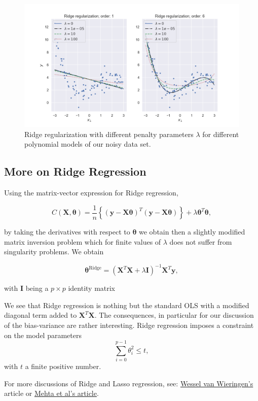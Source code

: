 \documentclass[%
oneside,                 %
final,                   %
10pt]{article}
\begin{document}
\begin{figure}[!ht]  %
  \centerline{\includegraphics[width=0.9\linewidth]{fig/ridge_reg.png}}
  \caption{
  Ridge regularization with different penalty parameters $\lambda$ for different polynomial models of our noisy data set. \label{fig-ridge_reg}
  }
\end{figure}




\subsection{More on Ridge Regression}

Using the matrix-vector expression for Ridge regression,

\[
C(\bm{X},\bm{\theta})=\frac{1}{n}\left\{(\bm{y}-\bm{X}\bm{\theta})^T(\bm{y}-\bm{X}\bm{\theta})\right\}+\lambda\bm{\theta}^T\bm{\theta},
\]

by taking the derivatives with respect to $\bm{\theta}$ we obtain then
a slightly modified matrix inversion problem which for finite values
of $\lambda$ does not suffer from singularity problems. We obtain

\[
\bm{\theta}^{\mathrm{Ridge}} = \left(\bm{X}^T\bm{X}+\lambda\bm{I}\right)^{-1}\bm{X}^T\bm{y},
\]

with $\bm{I}$ being a $p\times p$ identity matrix 

We see that Ridge regression is nothing but the standard
OLS with a modified diagonal term added to $\bm{X}^T\bm{X}$. The
consequences, in particular for our discussion of the bias-variance
are rather interesting. Ridge regression imposes a constraint on the model parameters
\[
\sum_{i=0}^{p-1} \theta_i^2 \leq t,
\]
with $t$ a finite positive number. 

For more discussions of Ridge and Lasso regression, see: \href{{https://arxiv.org/abs/1509.09169}}{Wessel van Wieringen's} article or \href{{https://arxiv.org/abs/1803.08823}}{Mehta et al's article}.
\end{document}
